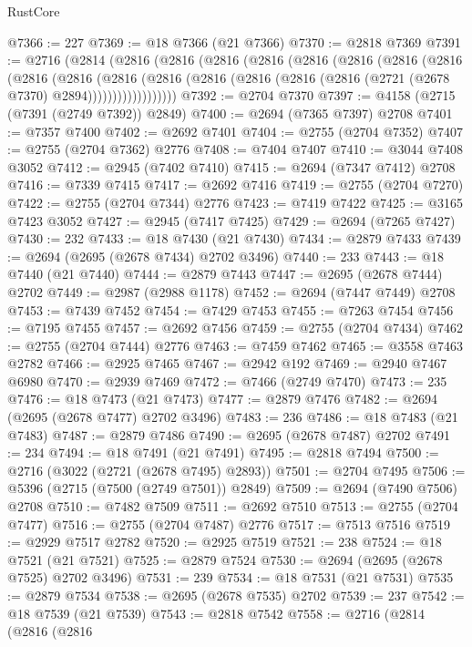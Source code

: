 \begin{lexlean}{RustCore}
\begin{coremodule}
@7366 := 227
@7369 := @18 @7366 (@21 @7366)
@7370 := @2818 @7369
@7391 := @2716
    (@2814
      (@2816
        (@2816
          (@2816
            (@2816
              (@2816
                (@2816
                  (@2816
                    (@2816
                      (@2816
                        (@2816
                          (@2816
                            (@2816
                              (@2816
                                (@2816 (@2816 (@2816 (@2721 (@2678 @7370) @2894))))))))))))))))))
@7392 := @2704 @7370
@7397 := @4158 (@2715 (@7391 (@2749 @7392)) @2849)
@7400 := @2694 (@7365 @7397) @2708
@7401 := @7357 @7400
@7402 := @2692 @7401
@7404 := @2755 (@2704 @7352)
@7407 := @2755 (@2704 @7362) @2776
@7408 := @7404 @7407
@7410 := @3044 @7408 @3052
@7412 := @2945 (@7402 @7410)
@7415 := @2694 (@7347 @7412) @2708
@7416 := @7339 @7415
@7417 := @2692 @7416
@7419 := @2755 (@2704 @7270)
@7422 := @2755 (@2704 @7344) @2776
@7423 := @7419 @7422
@7425 := @3165 @7423 @3052
@7427 := @2945 (@7417 @7425)
@7429 := @2694 (@7265 @7427)
@7430 := 232
@7433 := @18 @7430 (@21 @7430)
@7434 := @2879 @7433
@7439 := @2694 (@2695 (@2678 @7434) @2702 @3496)
@7440 := 233
@7443 := @18 @7440 (@21 @7440)
@7444 := @2879 @7443
@7447 := @2695 (@2678 @7444) @2702
@7449 := @2987 (@2988 @1178)
@7452 := @2694 (@7447 @7449) @2708
@7453 := @7439 @7452
@7454 := @7429 @7453
@7455 := @7263 @7454
@7456 := @7195 @7455
@7457 := @2692 @7456
@7459 := @2755 (@2704 @7434)
@7462 := @2755 (@2704 @7444) @2776
@7463 := @7459 @7462
@7465 := @3558 @7463 @2782
@7466 := @2925 @7465
@7467 := @2942 @192
@7469 := @2940 @7467 @6980
@7470 := @2939 @7469
@7472 := @7466 (@2749 @7470)
@7473 := 235
@7476 := @18 @7473 (@21 @7473)
@7477 := @2879 @7476
@7482 := @2694 (@2695 (@2678 @7477) @2702 @3496)
@7483 := 236
@7486 := @18 @7483 (@21 @7483)
@7487 := @2879 @7486
@7490 := @2695 (@2678 @7487) @2702
@7491 := 234
@7494 := @18 @7491 (@21 @7491)
@7495 := @2818 @7494
@7500 := @2716 (@3022 (@2721 (@2678 @7495) @2893))
@7501 := @2704 @7495
@7506 := @5396 (@2715 (@7500 (@2749 @7501)) @2849)
@7509 := @2694 (@7490 @7506) @2708
@7510 := @7482 @7509
@7511 := @2692 @7510
@7513 := @2755 (@2704 @7477)
@7516 := @2755 (@2704 @7487) @2776
@7517 := @7513 @7516
@7519 := @2929 @7517 @2782
@7520 := @2925 @7519
@7521 := 238
@7524 := @18 @7521 (@21 @7521)
@7525 := @2879 @7524
@7530 := @2694 (@2695 (@2678 @7525) @2702 @3496)
@7531 := 239
@7534 := @18 @7531 (@21 @7531)
@7535 := @2879 @7534
@7538 := @2695 (@2678 @7535) @2702
@7539 := 237
@7542 := @18 @7539 (@21 @7539)
@7543 := @2818 @7542
@7558 := @2716
    (@2814
      (@2816
        (@2816

\end{coremodule}
\end{lexlean}
